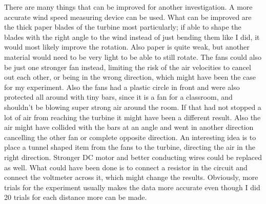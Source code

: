 \documentclass[12pt]{article}
\begin{document}
There are many things that can be improved for another investigation.
A more accurate wind speed measuring device can be used.
What can be improved are the thick paper blades of the turbine most particularly; if able to shape the blades with the right angle to the wind instead of just bending them like I did, it would most likely improve the rotation.
Also paper is quite weak, but another material would need to be very light to be able to still rotate.
The fans could also be just one stronger fan instead, limiting the risk of the air velocities to cancel out each other, or being in the wrong direction, which might have been the case for my experiment.
Also the fans had a plastic circle in front and were also protected all around with tiny bars, since it is a fan for a classroom, and shouldn't be blowing super strong air around the room.
If that had not stopped a lot of air from reaching the turbine it might have been a different result.
Also the air might have collided with the bars at an angle and went in another direction cancelling the other fan or complete opposite direction.
An interesting idea is to place a tunnel shaped item from the fans to the turbine, directing the air in the right direction.
Stronger DC motor and better conducting wires could be replaced as well.
What could have been done is to connect a resistor in the circuit and connect the voltmeter across it, which might change the results.
Obviously, more trials for the experiment usually makes the data more accurate even though I did 20 trials for each distance more can be made.




\nocite{*}
\newpage





\end{document}
